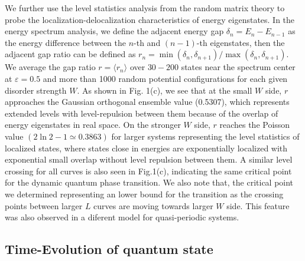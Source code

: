 \documentclass[prl,aps,epsf,showpacs,twocolumn,letterpaper]{revtex4}
\begin{document}
We further use the  level statistics analysis from the random matrix
theory\cite{atas2013,oganesyan2007} to probe the localization-delocalization
characteristics of  energy  eigenstates.
In the energy spectrum analysis\cite{luitz2015}, we define the adjacent  energy
gap $\delta_n=E_n-E_{n-1}$ as the energy difference between the $n$-th and
$(n-1)$-th eigenstates, then the adjacent gap ratio can be defined as
$r_n=\min(\delta_n, \delta_{n+1})/\max(\delta_n, \delta_{n+1})$.  We  average the
gap ratio $r=\langle r_n\rangle$  over $30-200$  states near the spectrum center at
$\varepsilon=0.5$   and more than 1000 random  potential configurations for each
given disorder  strength $W$.   As shown in Fig. 1(c),   we see that at the
small $W$ side, $r$ approaches  the Gaussian  orthogonal ensemble  value
(0.5307),  which represents extended levels with level-repulsion  between them
because of the overlap of  energy eigenstates in real space.  On the stronger
$W$ side,  $r$ reaches the Poisson value $(2\ln2-1\simeq 0.3863)$ for larger
systems representing the level statistics of   localized states, where  states
close in energies are  exponentially localized with exponential small overlap
without level repulsion between them\cite{mehta1991}.  A similar level crossing
for all curves is also seen in Fig.1(c),  indicating the same critical point for
the dynamic quantum phase transition.  We also note that,   the critical point
we determined representing an lower  bound for the transition as the crossing
points between larger $L$ curves are moving towards larger $W$ side.    This
feature was also observed in a diferent model for quasi-periodic
systems\cite{vedika2016}.




\subsection{Time-Evolution of quantum state}
\end{document}
